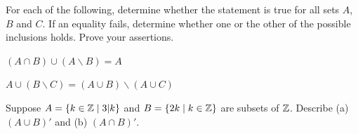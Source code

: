 For each of the following, determine whether the statement is true for
all sets $A$, $B$ and $C$.  If an equality fails, determine whether
one or the other of the possible inclusions holds. Prove your
assertions.


\begin{enumerate}
  \Problem $(A\cap B) \cup (A\smallsetminus B) = A$
  \vfill

  \Problem $A\cup (B\smallsetminus C) = (A\cup B) \smallsetminus (A\cup C)$
  \vfill
  
  
   \Problem\label{prob:1}%
  Suppose $A = \{ k\in\mathbb{Z}\;|\;3|k\}$ and $B=\{2k\;|\;k\in\mathbb{Z}\}$ are
  subsets of $\mathbb{Z}$.  Describe (a) $\left(A \cup B \right)'$ and (b)
  $\left(A \cap B \right)'$.  
  \vfill
\end{enumerate}

%
%


